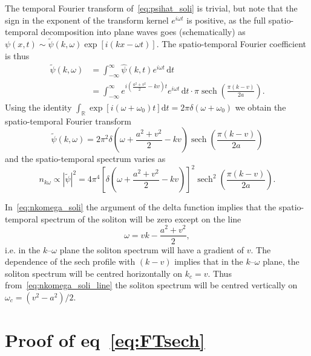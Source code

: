\documentclass[11pt,a4paper]{article}
\DeclareMathOperator{\sech}{sech}
\begin{document}
The temporal Fourier transform of~\eqref{eq:psihat_soli} is trivial, but note that the sign in the exponent of the transform kernel $e^{i\omega t}$ is positive, as the full spatio-temporal decomposition into plane waves goes (schematically) as $\psi(x,t) \sim \tilde{\psi}(k,\omega) \exp[i (kx - \omega t)]$. The spatio-temporal Fourier coefficient is thus
\begin{align*}
	\tilde{\psi}(k,\omega)  
			&=  \int_{-\infty}^{\infty} \! \hat{\psi}(k,t) e^{i\omega t} \, \mathrm{d}t 				\\
			&=  \int_{-\infty}^{\infty} \!  e^{i(\frac{a^2+v^2}{2}-kv)t}	e^{i\omega t} \, \mathrm{d}t \cdot \pi \sech\left( \frac{\pi(k-v)}{2a} \right).
\end{align*}
Using the identity $\int_\mathbb{R} \exp[i(\omega+\omega_0)t] \mathrm{d}t = 2\pi\delta(\omega+\omega_0)$ we obtain the spatio-temporal Fourier transform
\begin{equation}
	\label{eq:psitilde_soli}
	\tilde{\psi}(k,\omega)  = 2\pi^2 \delta\left(\omega+\frac{a^2+v^2}{2} -kv\right) \sech\left( \frac{\pi(k-v)}{2a} \right)
\end{equation}
and the spatio-temporal spectrum varies as
\begin{equation}
	\label{eq:nkomega_soli}
	n_{k\omega} \propto |\tilde{\psi}|^2 = 4\pi^4 \left[ \delta\left(\omega+\frac{a^2+v^2}{2} -kv\right) \right]^2  \sech^2\left( \frac{\pi(k-v)}{2a} \right).
\end{equation}

In~\eqref{eq:nkomega_soli} the argument of the delta function implies that the spatio-temporal spectrum of the soliton will be zero except on the line
\begin{equation}
	\label{eq:nkomega_soli_line}
	\omega = vk - \frac{a^2+v^2}{2},
\end{equation}
i.e. in the $k$--$\omega$ plane the soliton spectrum will have a gradient of $v$. The dependence of the sech profile with $(k-v)$ implies that in the $k$--$\omega$ plane, the soliton spectrum will be centred horizontally on $k_c=v$. Thus from~\eqref{eq:nkomega_soli_line} the soliton spectrum will be centred vertically on $\omega_c= (v^2-a^2)/2$.

\appendix

\section{Proof of eq~\eqref{eq:FTsech}}
\label{app:FTsech}
\end{document}
